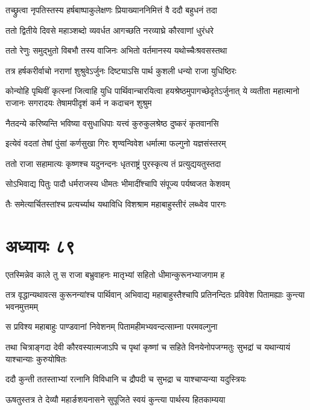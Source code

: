 \twolineshloka
{तच्छ्रुत्वा नृपतिस्तस्य हर्षबाष्पाकुलेक्षणः}
{प्रियाख्याननिमित्तं वै ददौ बहुधनं तदा}


\twolineshloka
{ततो द्वितीये दिवसे महाञ्शब्दो व्यवर्धत}
{आगच्छति नरव्याघ्रे कौरवाणां धुरंधरे}


\twolineshloka
{ततो रेणुः समुद्भुतो विबभौ तस्य वाजिनः}
{अभितो वर्तमानस्य यथोच्चैःश्रवसस्तथा}


\twolineshloka
{तत्र हर्षकरीर्वाचो नराणां शुश्रुवेऽर्जुनः}
{दिष्ट्याऽसि पार्थ कुशली धन्यो राजा युधिष्ठिरः}


कोन्योहि पृथिवीं कृत्स्नां जित्वाहि युधि पार्थिवान्चारयित्वा हयश्रेष्ठमुपागच्छेदृतेऽर्जुनात्
\twolineshloka
{ये व्यतीता महात्मानो राजानः सगरादयः}
{तेषामपीदृशं कर्म न कदाचन शुश्रुम}


\twolineshloka
{नैतदन्ये करिष्यन्ति भविष्या वसुधाधिपाः}
{यत्त्वं कुरुकुलश्रेष्ठ दुष्करं कृतवानसि}


\twolineshloka
{इत्येवं वदतां तेषां पुंसां कर्णसुखा गिरः}
{शृण्वन्विवेश धर्मात्मा फल्गुनो यज्ञसंस्तरम्}


\twolineshloka
{ततो राजा सहामात्यः कृष्णश्च यदुनन्दनः}
{धृतराष्ट्रं पुरस्कृत्य तं प्रत्युद्ययतुस्तदा}


\twolineshloka
{सोऽभिवाद्य पितुः पादौ धर्मराजस्य धीमतः}
{भीमादींश्चापि संपूज्य पर्यष्वजत केशवम्}


\twolineshloka
{तैः समेत्यार्चितस्तांश्च प्रत्यर्च्याथ यथाविधि}
{विशश्राम महाबाहुस्तीरं लब्ध्वेव पारगः}


\chapter{अध्यायः ८९}
\twolineshloka
{एतस्मिन्नेव काले तु स राजा बभ्रुवाहनः}
{मातृभ्यां सहितो धीमान्कुरूनभ्याजगाम ह}


\threelineshloka
{तत्र वृद्धान्यथावत्स कुरूनन्यांश्च पार्थिवान्}
{अभिवाद्य महाबाहुस्तैश्चापि प्रतिनन्दितः}
{प्रविवेश पितामह्याः कुन्त्या भवनमुत्तमम्}


\twolineshloka
{स प्रविश्य महाबाहुः पाण्डवानां निवेशनम्}
{पितामहीमभ्यवन्दत्साम्ना परमवल्गुना}


\threelineshloka
{तथा चित्राङ्गदा देवी कौरवस्यात्मजाऽपि च}
{पृथां कृष्णां च सहिते विनयेनोपजग्मतुः}
{सुभद्रां च यथान्यायं याश्चान्याः कुरुयोषितः}


\twolineshloka
{ददौ कुन्ती ततस्ताभ्यां रत्नानि विविधानि च}
{द्रौपदी च सुभद्रा च याश्चाप्यन्या यदुस्त्रियः}


\twolineshloka
{ऊषतुस्तत्र ते देव्यौ महार्ङशयनासने}
{सुपूजिते स्वयं कुन्त्या पार्थस्य हितकाम्यया}


